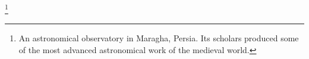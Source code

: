 \footnote{An astronomical observatory in Maragha, Persia. Its scholars produced some of the most advanced astronomical work of the medieval world.}